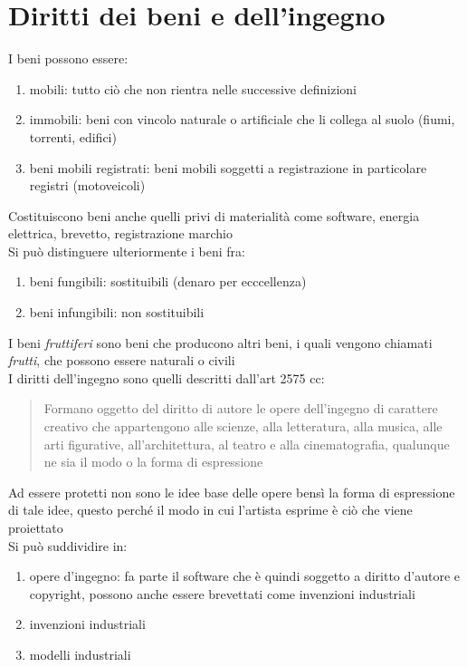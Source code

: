 \documentclass[8pt,oneside,a4paper]{article}
\begin{document}
	\section{Diritti dei beni e dell'ingegno}
	I beni possono essere:
	\begin{enumerate}
		\item mobili: tutto ciò che non rientra nelle successive definizioni
		\item immobili: beni con vincolo naturale o artificiale che li collega al suolo (fiumi, torrenti, edifici)
		\item beni mobili registrati: beni mobili soggetti a registrazione in particolare registri (motoveicoli)
	\end{enumerate}
	Costituiscono beni anche quelli privi di materialità come software, energia elettrica, brevetto, registrazione marchio\\
	Si può distinguere ulteriormente i beni fra:
	\begin{enumerate}
		\item beni fungibili: sostituibili (denaro per ecccellenza)
		\item beni infungibili: non sostituibili
	\end{enumerate}
	I beni \textit{fruttiferi} sono beni che producono altri beni, i quali vengono chiamati \textit{frutti}, che possono essere naturali o civili\\
	I diritti dell'ingegno sono quelli descritti dall'art 2575 cc:\\
	\begin{quote}
	Formano oggetto del diritto di autore le opere dell'ingegno di carattere creativo che appartengono alle scienze, alla letteratura, alla musica, alle 
	arti figurative, all'architettura, al teatro e alla cinematografia, qualunque ne sia il modo o la forma di espressione\\
	\end{quote}
	Ad essere protetti non sono le idee base delle opere bensì la forma di espressione di tale idee, questo perché il modo in cui l'artista esprime è ciò che viene proiettato\\
	Si può suddividire in:
	\begin{enumerate}
		\item opere d'ingegno: fa parte il software che è quindi soggetto a diritto d'autore e copyright, possono anche essere brevettati come invenzioni industriali 
		\item invenzioni industriali
		\item modelli industriali
	\end{enumerate}
\end{document}
